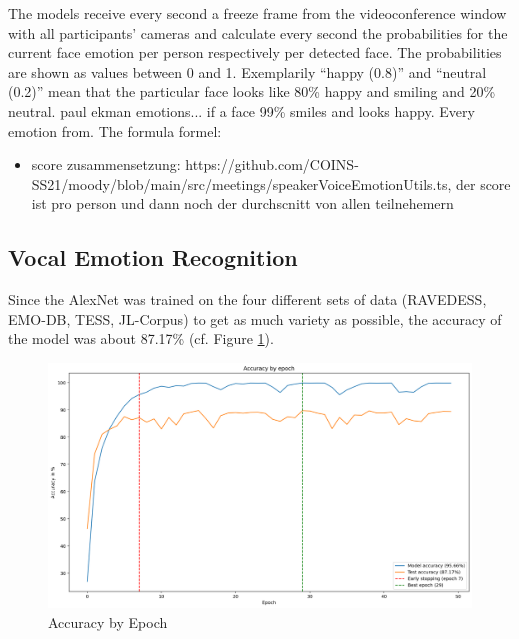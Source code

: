 The models receive every second a freeze frame from the videoconference window with all participants’ cameras and calculate every second the probabilities for the current face emotion per person respectively per detected face. The probabilities are shown as values between 0 and 1. Exemplarily ``happy (0.8)'' and ``neutral (0.2)'' mean that the particular face looks like 80\% happy and smiling and 20\% neutral. paul ekman emotions...
 if a face 99\% smiles and looks happy. Every emotion from. The formula 
formel:
\begin{itemize}
\item score zusammensetzung: https://github.com/COINS-SS21/moody/blob/main/src/meetings/speakerVoiceEmotionUtils.ts, der score ist pro person und dann noch der durchscnitt von allen teilnehemern
\end{itemize}

\subsection{Vocal Emotion Recognition}
\label{subsec:results_vocal_emotion_recognition}
Since the AlexNet was trained on the four different sets of data (RAVEDESS, EMO-DB, TESS, JL-Corpus) to get as much variety as possible, the accuracy of the model was about 87.17\% (cf. Figure \ref{fig:Accuracy by Epoch}). 

\begin{figure}
\centering
\includegraphics[width=1\textwidth]{assets/alexnet_accuracy.png}
\caption{Accuracy by Epoch}
\label{fig:Accuracy by Epoch}
\end{figure}

